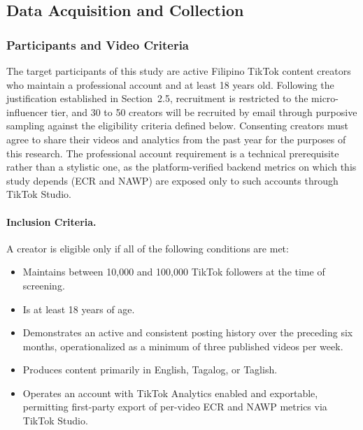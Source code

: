 \subsection{Data Acquisition and Collection}

\subsubsection{Participants and Video Criteria}
\label{sec:participants}

The target participants of this study are active Filipino TikTok content creators who maintain a professional account and at least 18 years old. Following the justification established in Section~2.5, recruitment is restricted to the micro-influencer tier, and 30 to 50 creators will be recruited by email through purposive sampling against the eligibility criteria defined below. Consenting creators must agree to share their videos and analytics from the past year for the purposes of this research. The professional account requirement is a technical prerequisite rather than a stylistic one, as the platform-verified backend metrics on which this study depends (ECR and NAWP) are exposed only to such accounts through TikTok Studio.

\paragraph{Inclusion Criteria.} A creator is eligible only if all of the following conditions are met:
\begin{itemize}
    \item Maintains between 10{,}000 and 100{,}000 TikTok followers at the time of screening.
    
    \item Is at least 18 years of age.

    \item Demonstrates an active and consistent posting history over the preceding six months, operationalized as a minimum of three published videos per week.

    \item Produces content primarily in English, Tagalog, or Taglish.

    \item Operates an account with TikTok Analytics enabled and exportable, permitting first-party export of per-video ECR and NAWP metrics via TikTok Studio.
\end{itemize}

